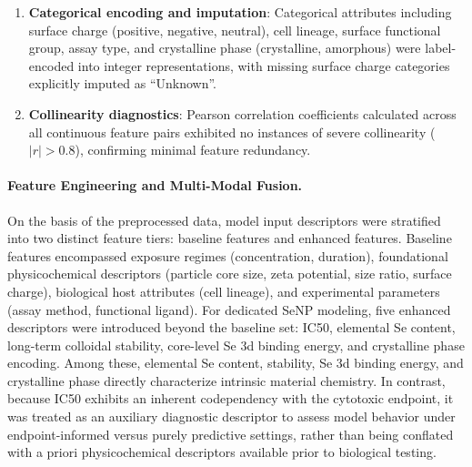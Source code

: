 \begin{enumerate}
  \item \textbf{Categorical encoding and imputation}: Categorical attributes including surface charge (positive, negative, neutral), cell lineage, surface functional group, assay type, and crystalline phase (crystalline, amorphous) were label-encoded into integer representations, with missing surface charge categories explicitly imputed as ``Unknown''.

  \item \textbf{Collinearity diagnostics}: Pearson correlation coefficients calculated across all continuous feature pairs exhibited no instances of severe collinearity ($|r| > 0.8$), confirming minimal feature redundancy.
\end{enumerate}

\paragraph{Feature Engineering and Multi-Modal Fusion.}
On the basis of the preprocessed data, model input descriptors were stratified into two distinct feature tiers: baseline features and enhanced features. Baseline features encompassed exposure regimes (concentration, duration), foundational physicochemical descriptors (particle core size, zeta potential, size ratio, surface charge), biological host attributes (cell lineage), and experimental parameters (assay method, functional ligand). For dedicated SeNP modeling, five enhanced descriptors were introduced beyond the baseline set: IC50, elemental Se content, long-term colloidal stability, core-level Se 3d binding energy, and crystalline phase encoding. Among these, elemental Se content, stability, Se 3d binding energy, and crystalline phase directly characterize intrinsic material chemistry. In contrast, because IC50 exhibits an inherent codependency with the cytotoxic endpoint, it was treated as an auxiliary diagnostic descriptor to assess model behavior under endpoint-informed versus purely predictive settings, rather than being conflated with a priori physicochemical descriptors available prior to biological testing.

